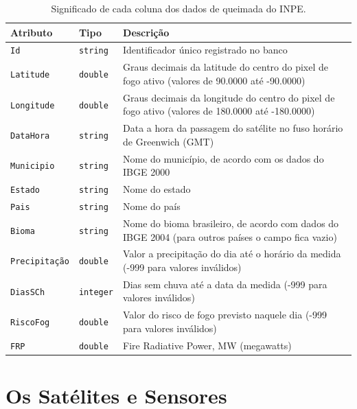 \documentclass[cic,tc]{iiufrgs}
\begin{document}
\begin{table}[htbp]
\centering
\caption{Significado de cada coluna dos dados de queimada do INPE.}
\begin{tabular}{@{}llp{9cm}@{}}
 \toprule
 \textbf{Atributo} & \textbf{Tipo} & \textbf{Descrição} \\
 \midrule
 \texttt{Id} & \texttt{string} & Identificador único registrado no banco \\
 \texttt{Latitude} & \texttt{double} & Graus decimais da latitude do centro 
                     do pixel de fogo ativo (valores de 90.0000 até -90.0000) \\ 
 \texttt{Longitude} & \texttt{double} & Graus decimais da longitude do centro 
                     do pixel de fogo ativo (valores de 180.0000 até -180.0000) \\  
 \texttt{DataHora} & \texttt{string} & Data a hora da passagem do satélite no fuso 
                     horário de Greenwich (GMT) \\   
 \texttt{Municipio} & \texttt{string} & Nome do município, de acordo com os dados 
                     do IBGE 2000 \\
 \texttt{Estado} & \texttt{string} & Nome do estado \\
 \texttt{Pais} & \texttt{string} & Nome do país \\  
 \texttt{Bioma} & \texttt{string} & Nome do bioma brasileiro, de acordo com 
                     dados do IBGE 2004 (para outros países o campo fica vazio) \\
 \texttt{Precipitação} & \texttt{double} & Valor a precipitação do dia até 
                     o horário da medida (-999 para valores inválidos) \\
 \texttt{DiasSCh} & \texttt{integer} & Dias sem chuva até a data da medida 
                     (-999 para valores inválidos) \\
 \texttt{RiscoFog} & \texttt{double} & Valor do risco de fogo previsto naquele dia 
                     (-999 para valores inválidos) \\
 \texttt{FRP} & \texttt{double} & Fire Radiative Power, MW (megawatts) \\
 \bottomrule
\end{tabular}
\label{table:inpeColumns}
\end{table}

\section{Os Satélites e Sensores}
\end{document}
